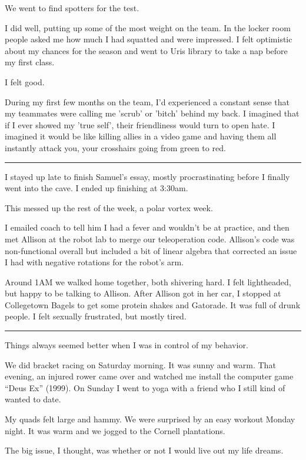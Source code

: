 We went to find spotters for the test.

I did well, putting up some of the most weight on the team.  In the locker room
people asked me how much I had squatted and were impressed.  I felt optimistic
about my chances for the season and went to Uris library to take a nap before my
first class.

I felt good.

During my first few months on the team, I'd experienced a constant sense that my
teammates were calling me 'scrub' or 'bitch' behind my back.  I imagined that if
I ever showed my 'true self', their friendliness would turn to open hate.  I
imagined it would be like killing allies in a video game and having them all
instantly attack you, your crosshairs going from green to red. 

\plainfancybreak{12pt}{2}{* * *}

I stayed up late to finish Samuel's essay, mostly procrastinating before I
finally went into the cave.  I ended up finishing at 3:30am.

This messed up the rest of the week, a polar vortex week.

I emailed coach to tell him I had a fever and wouldn't be at practice, and then
met Allison at the robot lab to merge our teleoperation code.   Allison's code
was non-functional overall but included a bit of linear algebra that corrected
an issue I had with negative rotations for the robot's arm.

Around 1AM we walked home together, both shivering hard.  I felt lightheaded,
but happy to be talking to Allison.  After Allison got in her car, I stopped at
Collegetown Bagels to get some protein shakes and Gatorade.  It was full of
drunk people.  I felt sexually frustrated, but mostly tired.

\plainfancybreak{12pt}{2}{* * *}

Things always seemed better when I was in control of my behavior.

We did bracket racing on Saturday morning.  It was sunny and warm.  That
evening, an injured rower came over and watched me install the computer game
``Deus Ex'' (1999).   On Sunday I went to yoga with a friend who I still kind of
wanted to date.

My quads felt large and hammy.  We were surprised by an easy workout Monday
night.  It was warm and we jogged to the Cornell plantations.

The big issue, I thought, was whether or not I would live out my life dreams.

